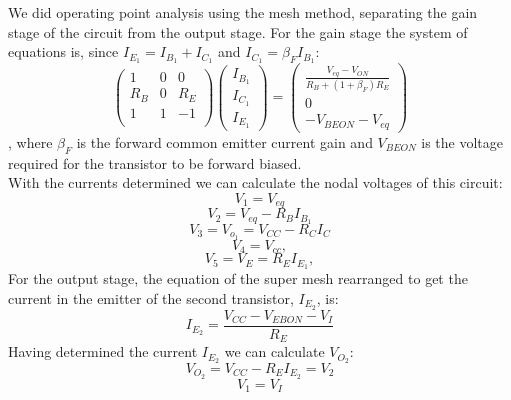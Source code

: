We did operating point analysis using the mesh method, separating the gain stage of the circuit from the output stage. For the gain stage the system of equations is, since $I_{E_1}=I_{B_1}+I_{C_1}$ and $I_{C_1}=\beta_F I_{B_1}$:
\begin{equation}
\left(\begin{array}{ccc} 1 & 0 & 0 \\
R_B & 0 & R_E\\
1 & 1 & -1 \\
\end{array}\right)
\left(\begin{array}{c} I_{B_1} \\ I_{C_1} \\ I_{E_1}  \end{array}\right) 
= \left(\begin{array}{c} \frac{V_{eq}-V_{ON}}{R_B+(1+\beta_F)R_E}\\ 0 \\ -V_{BEON}-V_{eq}  \end{array}\right)
\end{equation},
where $\beta_F$ is the forward common emitter current gain and $V_{BEON}$ is the voltage required for the transistor to be forward biased. \\
With the currents determined we can calculate the nodal voltages of this circuit:
\begin{equation}
    V_1=V_{eq}
\end{equation}
\begin{equation}
    V_2=V_{eq}-R_B I_{B_1}
\end{equation}
\begin{equation}
    V_3=V_{o_{1}}=V_{CC}-R_C I_C
\end{equation}
\begin{equation}
    V_4=V_{cc},
\end{equation}
\begin{equation}
    V_5= V_E=R_E I_{E_1},
\end{equation}
For the output stage, the equation of the super mesh rearranged to get the current in the emitter of the second transistor, $I_{E_{2}}$,  is: 
\begin{equation}
I_{E_2}=\frac{V_{CC}-V_{EBON}-V_I}{R_E}
\end{equation}
Having determined the current $I_{E_2}$ we can calculate $V_{O_2}$:
\begin{equation}
V_{O_2}=V_{CC}-R_E I_{E_2}=V_2
\end{equation}
\begin{equation} 
V_1=V_I
\end{equation}
